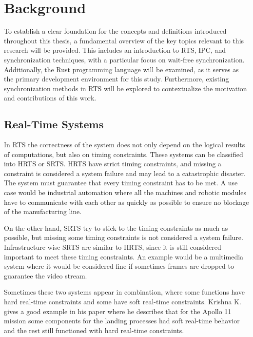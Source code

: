 \chapter{Background}\label{ch:background}

To establish a clear foundation for the concepts and definitions introduced throughout this thesis, a fundamental overview of the key topics relevant to this research will be provided. This includes an introduction to \ac{RTS}, \acf{IPC}, and synchronization techniques, with a particular focus on wait-free synchronization. Additionally, the Rust programming language will be examined, as it serves as the primary development environment for this study. Furthermore, existing synchronization methods in \ac{RTS} will be explored to contextualize the motivation and contributions of this work.

\section{Real-Time Systems}\label{sec:real-time}

In \ac{RTS} the correctness of the system does not only depend on the logical results of computations, but also on timing constraints. These systems can be classified into \ac{HRTS} or \ac{SRTS}. \ac{HRTS} have strict timing constraints, and missing a constraint is considered a system failure and may lead to a catastrophic disaster. The system must guarantee that every timing constraint has to be met. A use case would be industrial automation where all the machines and robotic modules have to communicate with each other as quickly as possible to ensure no blockage of the manufacturing line. \cite{HardSoftRealTime}

On the other hand, \ac{SRTS} try to stick to the timing constraints as much as possible, but missing some timing constraints is not considered a system failure. Infrastructure wise \ac{SRTS} are similar to \ac{HRTS}, since it is still considered important to meet these timing constraints. An example would be a multimedia system where it would be considered fine if sometimes frames are dropped to guarantee the video stream. \cite{HardSoftRealTime}

Sometimes these two systems appear in combination, where some functions have hard real-time constraints and some have soft real-time constraints. Krishna K. gives a good example in his paper where he describes that for the Apollo 11 mission some components for the landing processes had soft real-time behavior and the rest still functioned with hard real-time constraints. \cite{HardSoftRealTime}

